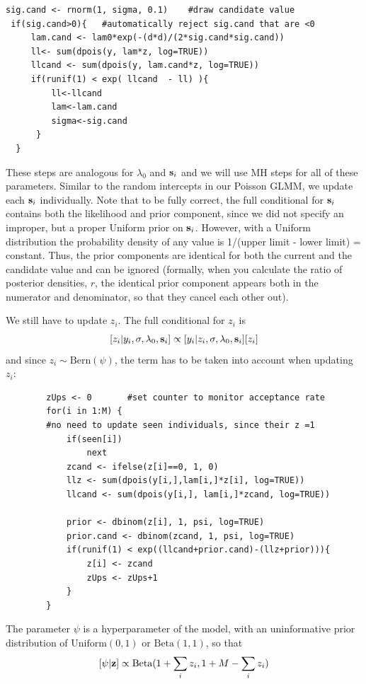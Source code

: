 \begin{verbatim}
sig.cand <- rnorm(1, sigma, 0.1)	#draw candidate value
 if(sig.cand>0){   #automatically reject sig.cand that are <0
     lam.cand <- lam0*exp(-(d*d)/(2*sig.cand*sig.cand))
     ll<- sum(dpois(y, lam*z, log=TRUE))
     llcand <- sum(dpois(y, lam.cand*z, log=TRUE))
     if(runif(1) < exp( llcand  - ll) ){
         ll<-llcand
         lam<-lam.cand
         sigma<-sig.cand
      }
  }
\end{verbatim}

These steps are analogous for  $\lambda_{0}$ and ${\bf s}_i$ and we will 
use MH steps for
all of these parameters. Similar to the random intercepts in our
Poisson GLMM, we update each ${\bf s}_i$ individually. Note that to be fully
correct, the full conditional for ${\bf s}_i$ contains both the likelihood and
prior component, since we did not specify an improper, but a proper Uniform
prior on ${\bf s}_i$. However, with a Uniform distribution the probability
density of any value is 1/(upper limit - lower limit) =
constant. Thus, the prior components are identical for both the
current and the candidate value and can be ignored (formally, when you
calculate the ratio of posterior densities, $r$, the identical prior
component appears both in the numerator and denominator, so that they
cancel each other out).

We still have to update $z_i$. The full conditional for $z_i$ is
\[
[z_i|y_{i}, \sigma, \lambda_0, {\bf s}_{i}] \propto [y_{i}|z_{i},\sigma, \lambda_0, 
{\bf s}_{i}] [z_i]
\]
and since $z_i \sim \mbox{Bern}(\psi)$,
the term has to be taken into account when updating $z_i$:

\begin{verbatim}
        zUps <- 0		#set counter to monitor acceptance rate
        for(i in 1:M) {
        #no need to update seen individuals, since their z =1
            if(seen[i])	
                next
            zcand <- ifelse(z[i]==0, 1, 0)
            llz <- sum(dpois(y[i,],lam[i,]*z[i], log=TRUE))
            llcand <- sum(dpois(y[i,], lam[i,]*zcand, log=TRUE))

            prior <- dbinom(z[i], 1, psi, log=TRUE)
            prior.cand <- dbinom(zcand, 1, psi, log=TRUE)
            if(runif(1) < exp((llcand+prior.cand)-(llz+prior))){
                z[i] <- zcand
                zUps <- zUps+1
            }
        }
\end{verbatim}
The parameter $\psi$ is a hyperparameter of the model, with an uninformative prior 
 distribution of $\mbox{Uniform}(0,1)$ or $\mbox{Beta}(1,1)$, so that
\[
[\psi|{\bf z}] \propto \mbox{Beta}(1 + \sum_i z_i, 1 + M-\sum_i z_i)
\]


